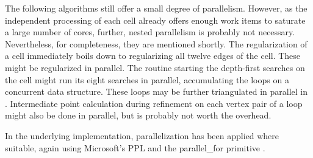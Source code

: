 The following algorithms still offer a small degree of parallelism.
However, as the independent processing of each cell already offers enough work items to saturate a large number of cores, further, nested parallelism is probably not necessary.
Nevertheless, for completeness, they are mentioned shortly.
The regularization of a cell immediately boils down to regularizing all twelve edges of the cell.
These might be regularized in parallel.
The  routine starting the depth-first searches on the cell might run its eight searches in parallel, accumulating the loops on a concurrent data structure.
These loops may be further triangulated in parallel in .
Intermediate point calculation during refinement on each vertex pair of a loop might also be done in parallel, but is probably not worth the overhead.

In the underlying implementation, parallelization has been applied where suitable, again using Microsoft's PPL and the parallel\_for primitive \cite{ppl_parallel_for}.
